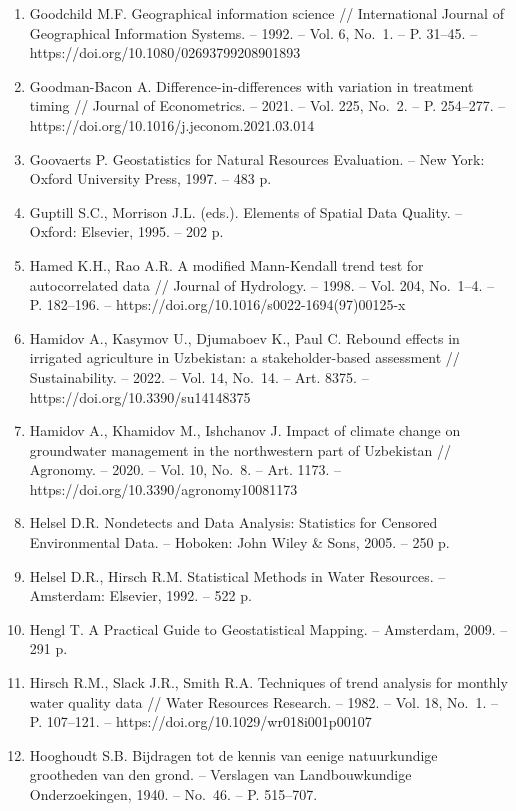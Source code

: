 \documentclass[14pt,a4paper,oneside]{extreport}
\begin{document}
\begin{enumerate}
\item
  Goodchild M.F. Geographical information science // International
  Journal of Geographical Information Systems. -- 1992. -- Vol. 6,
  No.~1. -- P. 31--45. -- https://doi.org/10.1080/02693799208901893
\item
  Goodman-Bacon A. Difference-in-differences with variation in treatment
  timing // Journal of Econometrics. -- 2021. -- Vol. 225, No.~2. -- P.
  254--277. -- https://doi.org/10.1016/j.jeconom.2021.03.014
\item
  Goovaerts P. Geostatistics for Natural Resources Evaluation. -- New
  York: Oxford University Press, 1997. -- 483 p.
\item
  Guptill S.C., Morrison J.L. (eds.). Elements of Spatial Data Quality.
  -- Oxford: Elsevier, 1995. -- 202 p.
\item
  Hamed K.H., Rao A.R. A modified Mann-Kendall trend test for
  autocorrelated data // Journal of Hydrology. -- 1998. -- Vol. 204,
  No.~1--4. -- P. 182--196. --
  https://doi.org/10.1016/s0022-1694(97)00125-x
\item
  Hamidov A., Kasymov U., Djumaboev K., Paul C. Rebound effects in
  irrigated agriculture in Uzbekistan: a stakeholder-based assessment //
  Sustainability. -- 2022. -- Vol. 14, No.~14. -- Art. 8375. --
  https://doi.org/10.3390/su14148375
\item
  Hamidov A., Khamidov M., Ishchanov J. Impact of climate change on
  groundwater management in the northwestern part of Uzbekistan //
  Agronomy. -- 2020. -- Vol. 10, No.~8. -- Art. 1173. --
  https://doi.org/10.3390/agronomy10081173
\item
  Helsel D.R. Nondetects and Data Analysis: Statistics for Censored
  Environmental Data. -- Hoboken: John Wiley \& Sons, 2005. -- 250 p.
\item
  Helsel D.R., Hirsch R.M. Statistical Methods in Water Resources. --
  Amsterdam: Elsevier, 1992. -- 522 p.
\item
  Hengl T. A Practical Guide to Geostatistical Mapping. -- Amsterdam,
  2009. -- 291 p.
\item
  Hirsch R.M., Slack J.R., Smith R.A. Techniques of trend analysis for
  monthly water quality data // Water Resources Research. -- 1982. --
  Vol. 18, No.~1. -- P. 107--121. --
  https://doi.org/10.1029/wr018i001p00107
\item
  Hooghoudt S.B. Bijdragen tot de kennis van eenige natuurkundige
  grootheden van den grond. -- Verslagen van Landbouwkundige
  Onderzoekingen, 1940. -- No.~46. -- P. 515--707.

\end{enumerate}
\end{document}
